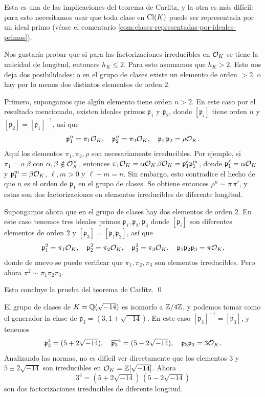 \vspace{1em}

Esta es una de las implicaciones del teorema de Carlitz, y la otra es más
difícil: para esto necesitamos usar que toda clase en $\operatorname{Cl} (K)$ puede ser
representada por un ideal primo (véase el comentario
\ref{com:clases-representadas-por-ideales-primos}).

Nos gustaría probar que si para las factorizaciones irreducibles en $\mathcal{O}_K$ se
tiene la unicidad de longitud, entonces $h_K \le 2$. Para esto asumamos que
$h_K > 2$. Esto nos deja dos posibilidades: o en el grupo de clases existe un
elemento de orden $> 2$, o hay por lo menos dos distintos elementos de orden $2$.

Primero, supongamos que algún elemento tiene orden $n > 2$. En este caso por el
resultado mencionado, existen ideales primos $\mathfrak{p}_1$ y
$\mathfrak{p}_2$, donde $[\mathfrak{p}_i]$ tiene orden $n$
y $[\mathfrak{p}_2] = [\mathfrak{p}_1]^{-1}$, así que
$$\mathfrak{p}_1^n = \pi_1 \mathcal{O}_K, \quad \mathfrak{p}_2^n = \pi_2 \mathcal{O}_K, \quad \mathfrak{p}_1\,\mathfrak{p}_2 = \rho \mathcal{O}_K.$$
Aquí los elementos $\pi_1, \pi_2, \rho$ son necesariamente irreducibles. Por
ejemplo, si $\pi_1 = \alpha\,\beta$ con $\alpha,\beta \notin \mathcal{O}_K^\times$,
entonces
$\pi_1 \mathcal{O}_K = \alpha \mathcal{O}_K \, \beta \mathcal{O}_K = \mathfrak{p}_1^\ell \mathfrak{p}_1^m$,
donde $\mathfrak{p}_1^\ell = \alpha \mathcal{O}_K$ y $\mathfrak{p}_1^m = \beta \mathcal{O}_K$,
$\ell,m > 0$ y $\ell + m = n$. Sin embargo, esto contradice el hecho de que
$n$ es el orden de $\mathfrak{p}_1$ en el grupo de clases. Se obtiene entonces
$\rho^n \sim \pi\,\pi'$, y estas son dos factorizaciones en elementos
irreducibles de diferente longitud.

Supongamos ahora que en el grupo de clases hay dos elementos de orden $2$.
En este caso tenemos tres ideales primos
$\mathfrak{p}_1,\mathfrak{p}_2,\mathfrak{p}_3$ donde
$[\mathfrak{p}_i]$ son diferentes elementos de orden $2$ y
$[\mathfrak{p}_3] = [\mathfrak{p}_1\mathfrak{p}_2]$, así que
\[ \mathfrak{p}_1^2 = \pi_1 \mathcal{O}_K, \quad
   \mathfrak{p}_2^2 = \pi_2 \mathcal{O}_K, \quad
   \mathfrak{p}_3^2 = \pi_3 \mathcal{O}_K, \quad
   \mathfrak{p}_1\mathfrak{p}_2\mathfrak{p}_3 = \pi \mathcal{O}_K, \]
donde de nuevo se puede verificar que $\pi_1, \pi_2, \pi_3$ son elementos
irreducibles. Pero ahora $\pi^2 \sim \pi_1\pi_2\pi_3$.

Esto concluye la prueba del teorema de Carlitz. \qed

\begin{ejemplo}
  El grupo de clases de $K = \mathbb{Q} (\sqrt{-14})$ es isomorfo a $\mathbb{Z}/4\mathbb{Z}$,
  y podemos tomar como el generador la clase de
  $\mathfrak{p}_3 = (3, 1 + \sqrt{-14})$. En este caso
  $[\mathfrak{p}_3]^{-1} = [\overline{\mathfrak{p}_3}]$, y tenemos
  \[ \mathfrak{p}_3^4 = (5 + 2\sqrt{-14}), \quad
     \overline{\mathfrak{p}_3}^4 = (5 - 2\sqrt{-14}), \quad
     \mathfrak{p}_3 \mathfrak{p}_3 = 3 \mathcal{O}_K. \]
  Analizando las normas, no es difícil ver directamente que los elementos $3$ y
  $5 \pm 2\sqrt{-14}$ son irreducibles en $\mathcal{O}_K = \mathbb{Z} [\sqrt{-14}]$. Ahora
  $$3^4 = (5 + 2\sqrt{-14})\,(5 - 2\sqrt{-14})$$
  son dos factorizaciones irreducibles de diferente longitud.
\end{ejemplo}

